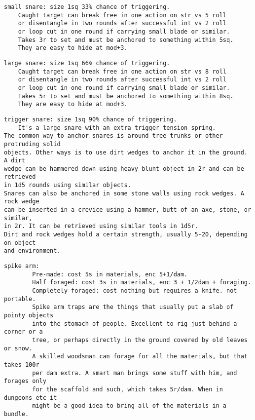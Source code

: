 \small \begin{samepage} \begin{verbatim}
small snare: size 1sq 33% chance of triggering.
    Caught target can break free in one action on str vs 5 roll
    or disentangle in two rounds after successful int vs 2 roll
    or loop cut in one round if carrying small blade or similar.
    Takes 3r to set and must be anchored to something within 5sq.
    They are easy to hide at mod+3.
\end{verbatim} \blocklistgap \begin{verbatim}
large snare: size 1sq 66% chance of triggering.
    Caught target can break free in one action on str vs 8 roll
    or disentangle in two rounds after successful int vs 2 roll
    or loop cut in one round if carrying small blade or similar.
    Takes 5r to set and must be anchored to something within 8sq.
    They are easy to hide at mod+3.
\end{verbatim} \blocklistgap \begin{verbatim}
trigger snare: size 1sq 90% chance of triggering.
    It's a large snare with an extra trigger tension spring.
The common way to anchor snares is around tree trunks or other protruding solid
objects. Other ways is to use dirt wedges to anchor it in the ground. A dirt
wedge can be hammered down using heavy blunt object in 2r and can be retrieved
in 1d5 rounds using similar objects.
Snares can also be anchored in some stone walls using rock wedges. A rock wedge
can be inserted in a crevice using a hammer, butt of an axe, stone, or similar,
in 2r. It can be retrieved using similar tools in 1d5r.
Dirt and rock wedges hold a certain strength, usually 5-20, depending on object
and environment.
\end{verbatim} \blocklistgap \begin{verbatim}
spike arm:
        Pre-made: cost 5s in materials, enc 5+1/dam.
        Half foraged: cost 3s in materials, enc 3 + 1/2dam + foraging.
        Completely foraged: cost nothing but requires a knife. not portable.
        Spike arm traps are the things that usually put a slab of pointy objects
        into the stomach of people. Excellent to rig just behind a corner or a
        tree, or perhaps directly in the ground covered by old leaves or snow.
        A skilled woodsman can forage for all the materials, but that takes 100r
        per dam extra. A smart man brings some stuff with him, and forages only
        for the scaffold and such, which takes 5r/dam. When in dungeons etc it
        might be a good idea to bring all of the materials in a bundle.

\end{verbatim}
\end{samepage}
